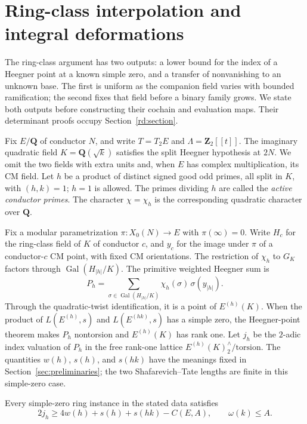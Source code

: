 \section{Ring-class interpolation and integral deformations}
\label{rl:section}

The ring-class argument has two outputs: a lower bound for the index of
a Heegner point at a known simple zero, and a transfer of nonvanishing to
an unknown base.  The first is uniform as the companion field varies
with bounded ramification; the second fixes that field before a binary
family grows.  We state both outputs before constructing their cochain
and evaluation maps.  Their determinant proofs occupy
Section~\ref{rd:section}.

Fix $E/\mathbf Q$ of conductor $N$, and write $T=T_2E$ and
$\Lambda=\mathbf Z_2[[t]]$.  The imaginary quadratic field
$K=\mathbf Q(\sqrt k)$ satisfies the split Heegner hypothesis at $2N$.
We omit the two fields with extra units and, when $E$ has complex
multiplication, its CM field.  Let $h$ be a product of distinct signed
good odd primes, all split in $K$, with $(h,k)=1$; $h=1$ is allowed.
The primes dividing $h$ are called the \emph{active conductor primes}.
The character $\chi=\chi_h$ is the corresponding quadratic character
over $\mathbf Q$.

Fix a modular parametrization $\pi:X_0(N)\to E$ with $\pi(\infty)=0$.
Write $H_c$ for the ring-class field of $K$ of conductor $c$, and $y_c$
for the image under $\pi$ of a conductor-$c$ CM point, with fixed CM
orientations.  The restriction of $\chi_h$ to $G_K$ factors through
$\operatorname{Gal}(H_{|h|}/K)$.  The primitive weighted Heegner sum is
\[
 P_h=\sum_{\sigma\in\operatorname{Gal}(H_{|h|}/K)}
             \chi_h(\sigma)\,\sigma(y_{|h|}).
\]
Through the quadratic-twist identification, it is a point of
$E^{(h)}(K)$.  When the product of $L(E^{(h)},s)$ and $L(E^{(hk)},s)$
has a simple zero,
the Heegner-point theorem makes $P_h$ nontorsion and
$E^{(h)}(K)$ has rank one.  Let $j_h$ be the $2$-adic index valuation of $P_h$
in the free rank-one lattice
$E^{(h)}(K)^\wedge_2/\mathrm{torsion}$.  The quantities $w(h)$,
$s(h)$, and $s(hk)$ have the meanings fixed in
Section~\ref{sec:preliminaries}; the two Shafarevich--Tate lengths are
finite in this simple-zero case.

\begin{corollary}
\label{rd:ring-lower}
Every simple-zero ring instance in the stated data satisfies
\begin{equation}
 2j_h\ge 4w(h)+s(h)+s(hk)-C(E,A),
       \qquad \omega(k)\le A.
 \label{rd:ring-lower-equation}
\end{equation}
\end{corollary}

